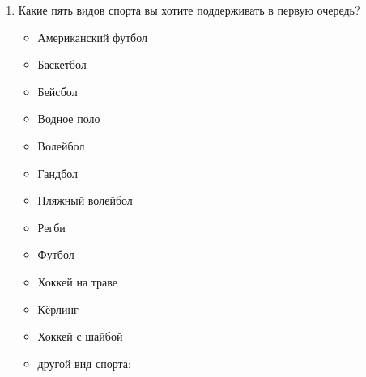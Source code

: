 \documentclass{article}
\newcommand{\red}[1]{\uline{\hspace*{1cm}\textcolor{white}{#1}\hspace*{1cm}}}
\begin{document}
\begin{enumerate}[label=\arabic*)]
    \item Какие пять видов спорта вы хотите поддерживать в первую очередь?
    \begin{itemize}[label=$\square$]
      \item Американский футбол
      \item Баскетбол
      \item Бейсбол
      \item Водное поло
      \item Волейбол
      \item Гандбол
      \item Пляжный волейбол
      \item Регби
      \item Футбол
      \item Хоккей на траве
      \item Кёрлинг
      \item Хоккей с шайбой
      \item другой вид спорта: \hspace{.5cm} \red{\hspace{2cm}}
    \end{itemize}
  \end{enumerate}
\end{document}
